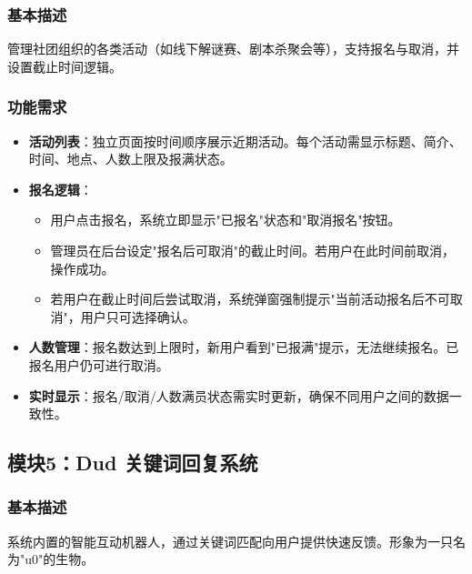 \documentclass[a4paper,12pt]{article}
\begin{document}
\subsubsection{基本描述}
管理社团组织的各类活动（如线下解谜赛、剧本杀聚会等），支持报名与取消，并设置截止时间逻辑。

\subsubsection{功能需求}
\begin{itemize}
    \item \textbf{活动列表}：独立页面按时间顺序展示近期活动。每个活动需显示标题、简介、时间、地点、人数上限及报满状态。
    \item \textbf{报名逻辑}：
        \begin{itemize}
            \item 用户点击报名，系统立即显示"已报名"状态和"取消报名"按钮。
            \item 管理员在后台设定"报名后可取消"的截止时间。若用户在此时间前取消，操作成功。
            \item 若用户在截止时间后尝试取消，系统弹窗强制提示"当前活动报名后不可取消"，用户只可选择确认。
        \end{itemize}
    \item \textbf{人数管理}：报名数达到上限时，新用户看到"已报满"提示，无法继续报名。已报名用户仍可进行取消。
    \item \textbf{实时显示}：报名/取消/人数满员状态需实时更新，确保不同用户之间的数据一致性。
\end{itemize}

\subsection{模块5：Dud 关键词回复系统}
\subsubsection{基本描述}
系统内置的智能互动机器人，通过关键词匹配向用户提供快速反馈。形象为一只名为"u0"的生物。
\end{document}
